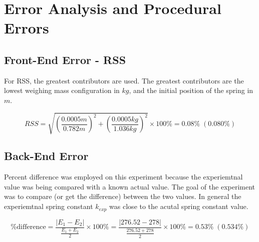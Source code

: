 \chapter{Error Analysis and Procedural Errors}

\section{Front-End Error - RSS}

For RSS, the greatest contributors are used. The greatest contributors are 
the lowest weighing mass configuration in $kg$, and the initial position of 
the spring in $m$.
  
  \begin{equation*}
    RSS = \sqrt{\left( \frac{0.0005m}{0.782m} \right)^2 
    + \left( \frac{0.0005kg}{1.036kg} \right)^2} \times 100\% = 0.08\% \; (0.080\%)
  \end{equation*}

\section{Back-End Error}

Percent difference was employed on this experiment because the experiemtnal value was 
being compared with a known actual value. The goal of the experiment was to compare (or
get the difference) between the two values. In general the experiemtnal spring constant $k_{exp}$
was close to the acutal spring constant value.

\begin{equation*}
  \%\text{difference}= \frac{|E_1 - E_2|}{\frac{E_1 + E_2}{2}} \times 100\% = 
  \frac{|276.52 - 278|}{\frac{276.52 + 278}{2}} \times 100\% = 0.53\% \; (0.534\%)
\end{equation*}

